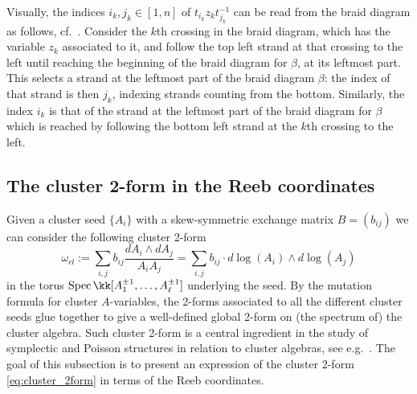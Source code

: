 \noindent Visually, the indices $i_k,j_k\in[1,n]$ of $t_{i_k}z_kt_{j_k}^{-1}$ can be read from the braid diagram as follows, cf.~\cite[Section 2.2]{CGGJ24}. Consider the $k$th crossing in the braid diagram, which has the variable $z_k$ associated to it, and follow the top left strand at that crossing to the left until reaching the beginning of the braid diagram for $\beta$, at its leftmost part. This selects a strand at the leftmost part of the braid diagram $\beta$: the index of that strand is then $j_k$, indexing strands counting from the bottom. Similarly, the index $i_k$ is that of the strand at the leftmost part of the braid diagram for $\beta$ which is reached by following the bottom left strand at the $k$th crossing to the left.

\subsection{The cluster 2-form in the Reeb coordinates}\label{sssec:symplectic_form_coordinates} Given a cluster seed $\{A_i\}$ with a skew-symmetric exchange matrix $B=(b_{ij})$ we can consider the following cluster 2-form
\begin{equation}\label{eq:cluster_2form}
\omega_{cl}:=\sum_{i,j}b_{ij}\frac{dA_i\wedge dA_j}{A_iA_j}=\sum_{i,j}b_{ij}\cdot d\log(A_i)\wedge d\log(A_j)
\end{equation}
\noindent in the torus $\Spec \kk[A_1^{\pm1},\ldots,A_\ell^{\pm1}]$ underlying the seed. By the mutation formula for cluster $A$-variables, the 2-forms associated to all the different cluster seeds glue together to give a well-defined global 2-form on (the spectrum of) the cluster algebra. Such cluster 2-form is a central ingredient in the study of symplectic and Poisson structures in relation to cluster algebras, see e.g.~\cite{FG2006,FG09,GSV05,GSV}. The goal of this subsection is to present an expression of the cluster 2-form \eqref{eq:cluster_2form} in terms of the Reeb coordinates.\\

